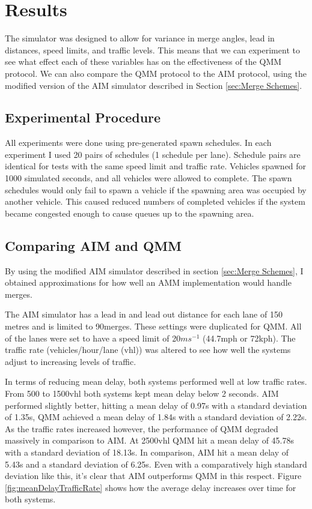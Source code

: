 \chapter{Results}
\label{cha:Results}
The simulator was designed to allow for variance in merge angles, lead in distances, speed limits, and traffic levels. This means that we can experiment to see what effect each of these variables has on the effectiveness of the QMM protocol. We can also compare the QMM protocol to the AIM protocol, using the modified version of the AIM simulator described in Section \ref{sec:Merge Schemes}.

\section{Experimental Procedure}
\label{sec:Experimental Procedure}
All experiments were done using pre-generated spawn schedules. In each experiment I used 20 pairs of schedules (1 schedule per lane). Schedule pairs are identical for tests with the same speed limit and traffic rate. Vehicles spawned for 1000 simulated seconds, and all vehicles were allowed to complete. The spawn schedules would only fail to spawn a vehicle if the spawning area was occupied by another vehicle. This caused reduced numbers of completed vehicles if the system became congested enough to cause queues up to the spawning area. 

\section{Comparing AIM and QMM}
\label{sec:Comparing AIM and Queue Protocols}
By using the modified AIM simulator described in section \ref{sec:Merge Schemes}, I obtained approximations for how well an AMM implementation would handle merges.

The AIM simulator has a lead in and lead out distance for each lane of 150 metres and is limited to 90\degree merges. These settings were duplicated for QMM. All of the lanes were set to have a speed limit of 20$\si{ms^{-1}}$ (44.7\si{mph} or 72\si{kph}). The traffic rate (vehicles/hour/lane (\si{vhl})) was altered to see how well the systems adjust to increasing levels of traffic.

In terms of reducing mean delay, both systems performed well at low traffic rates. From 500 to 1500\si{vhl} both systems kept mean delay below 2 seconds. AIM performed slightly better, hitting a mean delay of 0.97\si{s} with a standard deviation of 1.35\si{s}, QMM achieved a mean delay of 1.84\si{s} with a standard deviation of 2.22\si{s}. As the traffic rates increased however, the performance of QMM degraded massively in comparison to AIM. At 2500\si{vhl} QMM hit a mean delay of 45.78\si{s} with a standard deviation of 18.13\si{s}. In comparison, AIM hit a mean delay of 5.43\si{s} and a standard deviation of 6.25\si{s}. Even with a comparatively high standard deviation like this, it's clear that AIM outperforms QMM in this respect. Figure \ref{fig:meanDelayTrafficRate} shows how the average delay increases over time for both systems.

